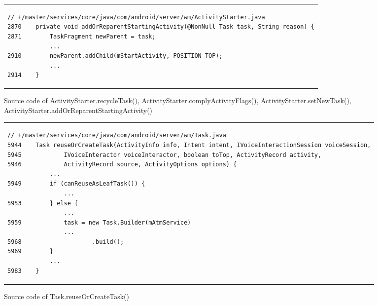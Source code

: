 \begin{figure}[H]
\begin{tabular*}{\linewidth}{l}
\begin{lstlisting}
// +/master/services/core/java/com/android/server/wm/ActivityStarter.java
2870    private void addOrReparentStartingActivity(@NonNull Task task, String reason) {
2871        TaskFragment newParent = task;
            ...
2910        newParent.addChild(mStartActivity, POSITION_TOP);
            ...
2914    }
\end{lstlisting}
\end{tabular*}
\caption{Source code of ActivityStarter.recycleTask(), ActivityStarter.complyActivityFlags(), ActivityStarter.setNewTask(), ActivityStarter.addOrReparentStartingActivity()} 
\label{code-recycle-set-NewTask}
\end{figure}


\begin{figure}[H]
\centering
\begin{tabular*}{\linewidth}{l}
\begin{lstlisting}
// +/master/services/core/java/com/android/server/wm/Task.java
5944    Task reuseOrCreateTask(ActivityInfo info, Intent intent, IVoiceInteractionSession voiceSession,
5945            IVoiceInteractor voiceInteractor, boolean toTop, ActivityRecord activity,
5946            ActivityRecord source, ActivityOptions options) {
            ...
5949        if (canReuseAsLeafTask()) {
                ...
5953        } else {
                ...
5959            task = new Task.Builder(mAtmService)
                ...
5968                    .build();
5969        }
            ...
5983    }
\end{lstlisting}
\end{tabular*}
\caption{Source code of Task.reuseOrCreateTask()} 
\label{code-reuseOrCreateTask}
\end{figure}




